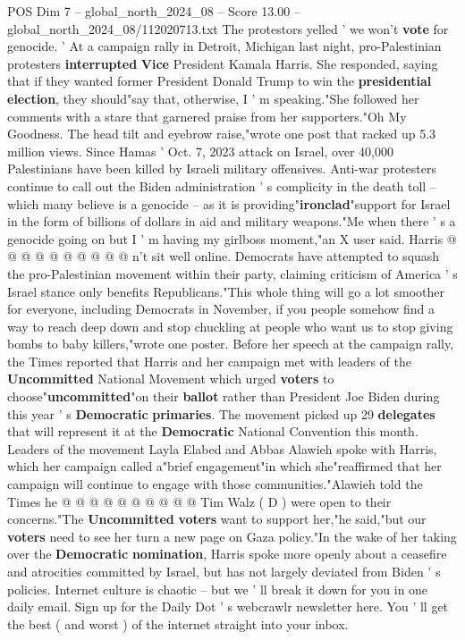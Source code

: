 \begin{textsample}{POS Dim 7 – global\_north\_2024\_08 – Score 13.00 – global\_north\_2024\_08/112020713.txt}  \label{ex:f7_pos_011}
The protestors yelled ' we won't \textbf{vote} for genocide. ' At a campaign rally in Detroit, Michigan last night, pro-Palestinian protesters \textbf{interrupted} \textbf{Vice} President Kamala Harris.
She responded, saying that if they wanted former President Donald Trump to win the \textbf{presidential} \textbf{election}, they should"say that, otherwise, I ' m speaking."She followed her comments with a stare that garnered praise from her supporters."Oh My Goodness.
The head tilt and eyebrow raise,"wrote one post that racked up 5.3 million views.
Since Hamas ' Oct. 7, 2023 attack on Israel, over 40,000 Palestinians have been killed by Israeli military offensives.
Anti-war protesters continue to call out the Biden administration ' s complicity in the death toll -- which many believe is a genocide -- as it is providing"\textbf{ironclad}"support for Israel in the form of billions of dollars in aid and military weapons."Me when there ' s a genocide going on but I ' m having my girlboss moment,"an X user said.
Harris @ @ @ @ @ @ @ @ @ @ n't sit well online.
Democrats have attempted to squash the pro-Palestinian movement within their party, claiming criticism of America ' s Israel stance only benefits Republicans."This whole thing will go a lot smoother for everyone, including Democrats in November, if you people somehow find a way to reach deep down and stop chuckling at people who want us to stop giving bombs to baby killers,"wrote one poster.
Before her speech at the campaign rally, the Times reported that Harris and her campaign met with leaders of the \textbf{Uncommitted} National Movement which urged \textbf{voters} to choose"\textbf{uncommitted}"on their \textbf{ballot} rather than President Joe Biden during this year ' s \textbf{Democratic} \textbf{primaries}.
The movement picked up 29 \textbf{delegates} that will represent it at the \textbf{Democratic} National Convention this month.
Leaders of the movement Layla Elabed and Abbas Alawieh spoke with Harris, which her campaign called a"brief engagement"in which she"reaffirmed that her campaign will continue to engage with those communities."Alawieh told the Times he @ @ @ @ @ @ @ @ @ @ Tim Walz ( D ) were open to their concerns."The \textbf{Uncommitted} \textbf{voters} want to support her,"he said,"but our \textbf{voters} need to see her turn a new page on Gaza policy."In the wake of her taking over the \textbf{Democratic} \textbf{nomination}, Harris spoke more openly about a ceasefire and atrocities committed by Israel, but has not largely deviated from Biden ' s policies.
Internet culture is chaotic -- but we ' ll break it down for you in one daily email.
Sign up for the Daily Dot ' s webcrawlr newsletter here.
You ' ll get the best ( and worst ) of the internet straight into your inbox.

\end{textsample}
